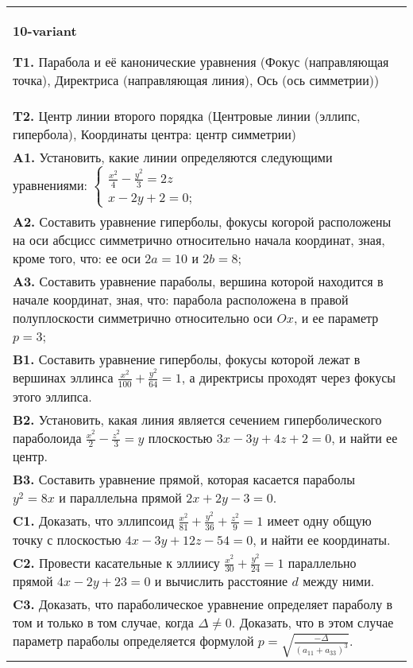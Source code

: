\documentclass{article}
\begin{document}
\begin{tabular}{m{17cm}}
\textbf{10-variant}
\newline

\textbf{T1.} Парабола и её канонические уравнения (Фокус (направляющая точка), Директриса (направляющая линия), Ось (ось симметрии)) \\
\textbf{T2.} Центр линии второго порядка (Центровые линии (эллипс, гипербола), Координаты центра: центр симметрии) \\
\textbf{A1.} Установить, какие линии определяются следующими уравнениями: $\left\{\begin{array}{l}\frac{x^2}{4}-\frac{y^2}{3}=2 z \\ x-2 y+2=0 ;\end{array}\right.$ \\
\textbf{A2.} Составить уравнение гиперболы, фокусы когорой расположены на оси абсцисс симметрично относительно начала координат, зная, кроме того, что: ее оси $2 a=10$ и $2 b=8$; \\
\textbf{A3.} Составить уравнение параболы, вершина которой находится в начале координат, зная, что: парабола расположена в правой полуплоскости симметрично относительно оси $O x$, и ее параметр $p=3$; \\
\textbf{B1.} Составить уравнение гиперболы, фокусы которой лежат в вершинах эллинса $\frac{x^2}{100}+\frac{y^2}{64}=1$, а директрисы проходят через фокусы этого эллипса. \\
\textbf{B2.} Установить, какая линия является сечением гиперболического параболоида $\frac{x^2}{2}-\frac{z^2}{3}=y$ плоскостью $3 x-3 y+4 z+2=0$, и найти ее центр. \\
\textbf{B3.} Составить уравнение прямой, которая касается параболы $y^2=8 x$ и параллельна прямой $2 x+2 y-3=0$. \\
\textbf{C1.} Доказать, что эллипсоид $\frac{x^2}{81}+\frac{y^2}{36}+\frac{z^2}{9}=1$ имеет одну общую точку с плоскостью $4 x-3 y+12 z-54=0$, и найти ее координаты. \\
\textbf{C2.} Провести касательные к эллиису $\frac{x^2}{30}+\frac{y^2}{24}=1$ параллельно прямой $4 x-2 y+23=0$ и вычислить расстояние $d$ между ними. \\
\textbf{C3.} Доказать, что параболическое уравнение определяет параболу в том и только в том случае, когда $\Delta \neq 0$. Доказать, что в этом случае параметр параболы определяется формулой $p=\sqrt{\frac{-\Delta}{ (a_{11}+a_{33}) ^3}}$. \\

\end{tabular}
\vspace{1cm}
\end{document}
